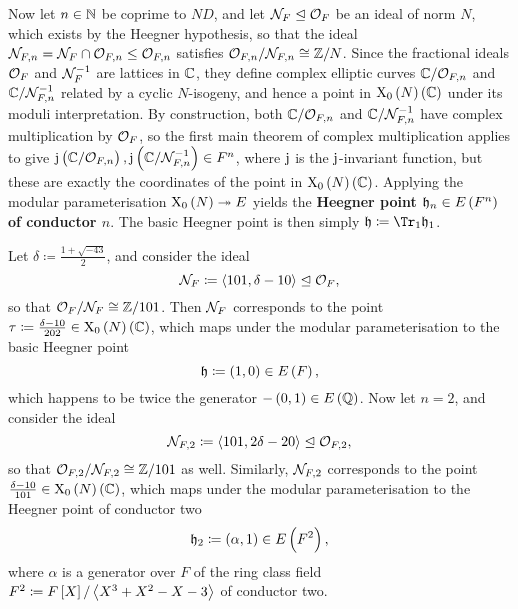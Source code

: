 Now let $ n \in \mathbb{N} $ be coprime to $ ND $, and let $ \mathcal{N}_F \trianglelefteq \mathcal{O}_F $ be an ideal of norm $ N $, which exists by the Heegner hypothesis, so that the ideal $ \mathcal{N}_{F, n} = \mathcal{N}_F \cap \mathcal{O}_{F, n} \le \mathcal{O}_{F, n} $ satisfies $ \mathcal{O}_{F, n} / \mathcal{N}_{F, n} \cong \mathbb{Z} / N $. Since the fractional ideals $ \mathcal{O}_F $ and $ \mathcal{N}_F^{-1} $ are lattices in $ \mathbb{C} $, they define complex elliptic curves $ \mathbb{C} / \mathcal{O}_{F, n} $ and $ \mathbb{C} / \mathcal{N}_{F, n}^{-1} $ related by a cyclic $ N $-isogeny, and hence a point in $ \X_0\br{N}\br{\CC} $ under its moduli interpretation. By construction, both $ \mathbb{C} / \mathcal{O}_{F, n} $ and $ \mathbb{C} / \mathcal{N}_{F, n}^{-1} $ have complex multiplication by $ \mathcal{O}_F $, so the first main theorem of complex multiplication applies to give $ \j\br{\CC / \OOO_{F, n}}, \j\br{\CC / \NNN_{F, n}^{-1}} \in F^n $, where $ \mathrm{j} $ is the $ \mathrm{j} $-invariant function, but these are exactly the coordinates of the point in $ \X_0\br{N}\br{\CC} $. Applying the modular parameterisation $ \X_0\br{N} \twoheadrightarrow E $ yields the \textbf{Heegner point $ \hhh_n \in E\br{F^n} $ of conductor $ n $}. The basic Heegner point is then simply $ \hhh \coloneqq \Tr_1 \hhh_1 $.

\pagebreak

\begin{example}
Let $ \delta \coloneqq \tfrac{1 + \sqrt{-43}}{2} $, and consider the ideal
$$ \mathcal{N}_F \coloneqq \left\langle 101, \delta - 10 \right\rangle \trianglelefteq \mathcal{O}_F, $$
so that $ \mathcal{O}_F / \mathcal{N}_F \cong \mathbb{Z} / 101 $. Then $ \mathcal{N}_F $ corresponds to the point $ \tau \coloneqq \tfrac{\delta - 10}{202} \in \X_0\br{N}\br{\CC} $, which maps under the modular parameterisation to the basic Heegner point
$$ \hhh \coloneqq \br{1, 0} \in E\br{F}, $$
which happens to be twice the generator $ -\br{0, 1} \in E\br{\QQ} $. Now let $ n = 2 $, and consider the ideal
$$ \mathcal{N}_{F, 2} \coloneqq \left\langle 101, 2\delta - 20 \right\rangle \trianglelefteq \mathcal{O}_{F, 2}, $$
so that $ \mathcal{O}_{F, 2} / \mathcal{N}_{F, 2} \cong \mathbb{Z} / 101 $ as well. Similarly, $ \mathcal{N}_{F, 2} $ corresponds to the point $ \tfrac{\delta - 10}{101} \in \X_0\br{N}\br{\CC} $, which maps under the modular parameterisation to the Heegner point of conductor two
$$ \hhh_2 \coloneqq \br{\alpha, 1} \in E\br{F^2}, $$
where $ \alpha $ is a generator over $ F $ of the ring class field $ F^2 \coloneqq F\sbr{X} / \abr{X^3 + X^2 - X - 3} $ of conductor two.
\end{example}

